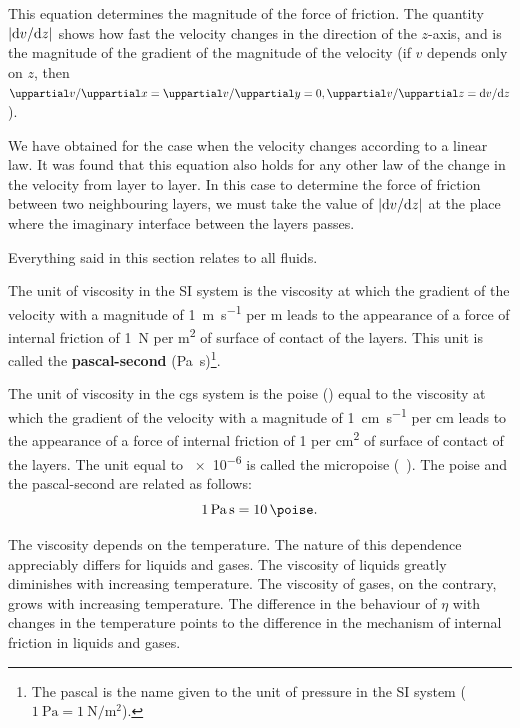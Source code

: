 This equation determines the magnitude of the force of friction. The quantity $|\mathrm{d} v/\mathrm{d} z|$ shows how fast the velocity changes in the direction of the $z$-axis, and is the magnitude of the gradient of the magnitude of the velocity (if $v$ depends only on $z$, then $\diffinpartial{v}{x}=\diffinpartial{v}{y}=0, \diffinpartial{v}{z}=\diffin{v}{z}$).

We have obtained  for the case when the velocity changes according to a linear law. It was found that this equation also holds for any other law of the change in the velocity from layer to layer. In this case to determine the force of friction between two neighbouring layers, we must take the value of $|\mathrm{d} v/\mathrm{d} z|$ at the place where the imaginary interface between the layers passes.

Everything said in this section relates to all fluids.

The unit of viscosity in the SI system is the viscosity at which the gradient of the velocity with a magnitude of \SI{1}{\metre\per\second} per \si{\metre} leads to the appearance of a force of internal friction of \SI{1}{\newton} per \si{\metre\squared} of surface of contact of the layers. This unit is called the \textbf{pascal-second} (\si{\pascal\second})\footnote{The pascal is the name given to the unit of pressure in the SI system ($\SI{1}{\pascal}=\SI{1}{\newton\per\metre\squared}$).}.

The unit of viscosity in the cgs system is the poise (\si{\poise}) equal to the viscosity at which the gradient of the velocity with a magnitude of \SI{1}{\centi\metre\per\second} per \si{\centi\metre} leads to the appearance of a force of internal friction of \SI{1}{\dyne} per \si{\centi\metre\squared} of surface of contact of the layers. The unit equal to \SI{e-6}{\poise} is called the micropoise (\si{\micro\poise}). The poise and the pascal-second are related as follows:
\begin{equation*}
	\SI{1}{\pascal\second} = \SI{10}{\poise}.
\end{equation*}

The viscosity depends on the temperature. The nature of this dependence appreciably differs for liquids and gases. The viscosity of liquids greatly diminishes with increasing temperature. The viscosity of gases, on the contrary, grows with increasing temperature. The difference in the behaviour of $\eta$ with changes in the temperature points to the difference in the mechanism of internal friction in liquids and gases.

